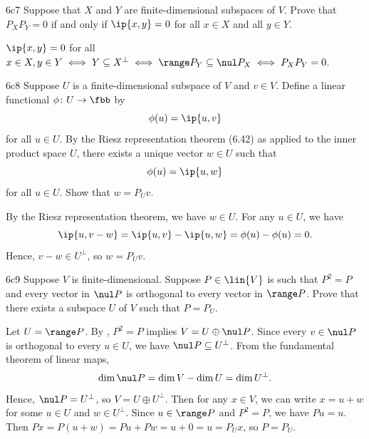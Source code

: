 \begin{exercise}{6c7}
    Suppose that $X$ and $Y$ are finite-dimensional subspaces of $V$.
    Prove that $P_X P_Y = 0$ if and only if $\ip{x, y} = 0$ for all $x \in X$ and all $y \in Y$.
\end{exercise}

\begin{sol}
    $\ip{x, y} = 0$ for all $x \in X, y \in Y \iff Y \subseteq X^\perp \iff \range P_Y \subseteq \nul P_X \iff P_X P_Y = 0$.
\end{sol}

\begin{exercise}{6c8}
    Suppose $U$ is a finite-dimensional subspace of $V$ and $v \in V$.
    Define a linear functional $\phi\colon U \to \fbb$ by
    \[
        \phi(u) = \ip{u, v}
    \]
    for all $u \in U$.
    By the Riesz representation theorem (6.42) as applied to the inner product space $U$, there exists a unique vector $w \in U$ such that
    \[
        \phi(u) = \ip{u, w}
    \]
    for all $u \in U$.
    Show that $w = P_U v$.
\end{exercise}

\begin{sol}
    By the Riesz representation theorem, we have $w \in U$. For any $u \in U$, we have
    \[
        \ip{u, v - w} = \ip{u, v} - \ip{u, w} = \phi(u) - \phi(u) = 0.
    \]
    Hence, $v - w \in U^\perp$, so $w = P_U v$.
\end{sol}

\begin{exercise}{6c9}
    Suppose $V$ is finite-dimensional.
    Suppose $P \in \lin{V}$ is such that $P^2 = P$ and every vector in $\nul P$ is orthogonal to every vector in $\range P$.
    Prove that there exists a subspace $U$ of $V$ such that $P = P_U$.
\end{exercise}

\begin{sol}
    Let $U = \range P$.
    By , $P^2 = P$ implies $V = U \oplus \nul P$.
    Since every $v \in \nul P$ is orthogonal to every $u \in U$, we have $\nul P \subseteq U^\perp$.
    From the fundamental theorem of linear maps,
    \[
        \dim \nul P = \dim V - \dim U = \dim U^\perp.
    \]
    Hence, $\nul P = U^\perp$, so $V = U \oplus U^\perp$.
    Then for any $x \in V$, we can write $x = u + w$ for some $u \in U$ and $w \in U^\perp$.
    Since $u \in \range P$ and $P^2 = P$, we have $Pu = u$.
    Then $Px = P(u + w) = Pu + Pw = u + 0 = u = P_U x$, so $P = P_U$.
\end{sol}

